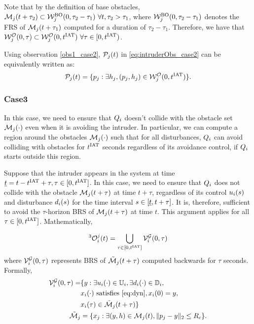 \begin{observation} \label{obs1_case2}
Note that by the definition of base obstacles, $\mathcal{M}_j(t+\tau_2) \subset \mathcal{W}_{j}^{\text{BO}}(0, \tau_2-\tau_1) ~\forall t, \tau_2 > \tau_1$, where $\mathcal{W}_{j}^{\text{BO}}(0, \tau_2-\tau_1)$ denotes the FRS of $\mathcal{M}_j(t+\tau_1)$ computed for a duration of $\tau_2-\tau_1$. Therefore, we have that $\mathcal{W}_{j}^{\mathcal{O}}(0, \tau) \subset \mathcal{W}_{j}^{\mathcal{O}}(0, t^\text{IAT}) ~\forall \tau \in [0, t^\text{IAT})$. 
\end{observation}

Using observation \ref{obs1_case2}, $\mathcal{P}_j(t)$ in \eqref{eq:intruderObs_case2} can be equivalently written as:
\begin{equation} \label{eq:intruderObs_case2_inter}
\pfrs_j(t) = \{p_j: \exists \npos_j, (p_j, \npos_j) \in \frs_{j}^{\mathcal{O}}(0, \iat) \}.
\end{equation}


\subsubsection{Case3} \label{sec:intruderObs_case3}
In this case, we need to ensure that $Q_i$ doesn't collide with the obstacle set $\mathcal{M}_j(\cdot)$ even when it is avoiding the intruder. In particular, we can compute a region around the obstacles $\mathcal{M}_j(\cdot)$ such that for all disturbances, $Q_i$ can avoid colliding with obstacles for $t^\text{IAT}$ seconds regardless of its avoidance control, if $Q_i$ starts outside this region. 

Suppose that the intruder appears in the system at time $\underline{t} = t - t^\text{IAT} + \tau, \tau \in [0, t^\text{IAT}]$. In this case, we need to ensure that $Q_i$ does not collide with the obstacle $\mathcal{M}_j(t + \tau)$ at time $t + \tau$, regardless of its control $u_i(s)$ and disturbance $d_i(s)$ for the time interval $s \in [\underline{t}, t + \tau]$. It is, therefore, sufficient to avoid the $\tau$-horizon BRS of $\mathcal{M}_j(t + \tau)$ at time $t$. This argument applies for all $\tau \in [0, t^\text{IAT}]$. Mathematically,

\begin{equation} \label{eq:intruderObs_case3}
^3\ioset_i^j(t) = \bigcup_{\tau \in [0, \iat]} \brs^{\mathcal{G}}_{i}(0, \tau)
\end{equation}
where $\mathcal{V}^{\mathcal{G}}_{i}(0, \tau)$ represents BRS of $\tilde{\mathcal{M}}_j(t+\tau)$ computed backwards for $\tau$ seconds. Formally, 
\begin{equation}  \label{eq:ObsBRS_case3}
\begin{aligned}
\brs^{\mathcal{G}}_{i}(0, \tau) = & \{y: \exists \ctrl_i(\cdot) \in \cfset_i, \exists \dstb_i(\cdot) \in \dfset_i, \\
& \state_i(\cdot) \text{ satisfies \eqref{eq:dyn}}, \state_i(0) = y, \\
& \state_i(\tau) \in \tilde{\boset}_j(t+\tau)\} \\
\tilde{\boset}_j & = \{\state_j: \exists (y, h) \in \boset_j(t), \|\pos_j - y\|_2 \le \rc \}.
\end{aligned}
\end{equation}

